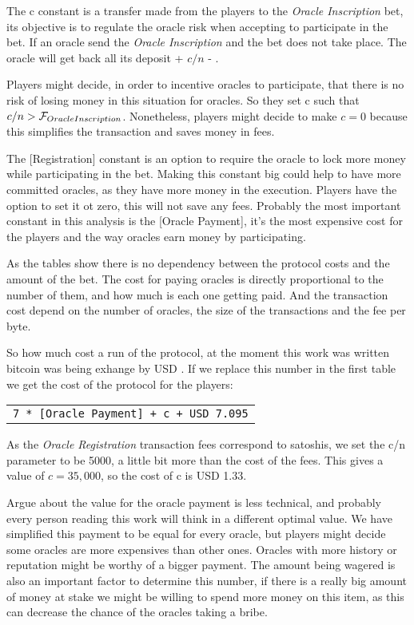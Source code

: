 The c constant is a transfer made from the players to the
  \textit{Oracle Inscription} bet, its objective is to regulate the oracle
  risk when accepting to participate in the bet.
If an oracle send the \textit{Oracle Inscription} and the bet does not take
  place. The oracle will get back all its deposit + $c/n$ -
  .

Players might decide, in order to incentive oracles to participate, that there
  is no risk of losing money in this situation for oracles. So they set c such
  that $c/n > \mathcal{F}_{OracleInscription}$.
Nonetheless, players might decide to make $c = 0$ because this simplifies the
  transaction and saves money in fees.

The [Registration] constant is an option to require the oracle to lock more
  money while participating in the bet.
Making this constant big could help to have more committed oracles, as they
  have more money in the execution.
Players have the option to set it ot zero, this will not save any fees.
Probably the most important constant in this analysis is the [Oracle Payment],
  it's the most expensive cost for the players and the way oracles earn money
  by participating.

As the tables show there is no dependency between the protocol costs and the
  amount of the bet.
The cost for paying oracles is directly proportional to the number of them, and
  how much is each one getting paid.
And the transaction cost depend on the number of oracles, the size of the
  transactions and the fee per byte.

So how much cost a run of the protocol, at the moment this work was written
  bitcoin was being exhange by USD \bitcoinusd{}. If we replace this number
  in the first table we get the cost of the protocol for the players:
\begin{center}
    \begin{tabular}{|c|}
        \texttt{7 * [Oracle Payment] + c + USD 7.095}
    \end{tabular}
\end{center}

As the \textit{Oracle Registration} transaction fees correspond to
  \mbox{} satoshis, we set the c/n parameter to be 5000, a
  little bit more than the cost of the fees.
This gives a value of $c = 35,000$, so the cost of c is USD 1.33.

Argue about the value for the oracle payment is less technical, and probably
  every person reading this work will think in a different optimal value.
We have simplified this payment to be equal for every oracle, but players
  might decide some oracles are more expensives than other ones.
Oracles with more history or reputation might be worthy of a bigger payment.
The amount being wagered is also an important factor to determine this number,
  if there is a really big amount of money at stake we might be willing to
  spend more money on this item, as this can decrease the chance of the oracles
  taking a bribe.

